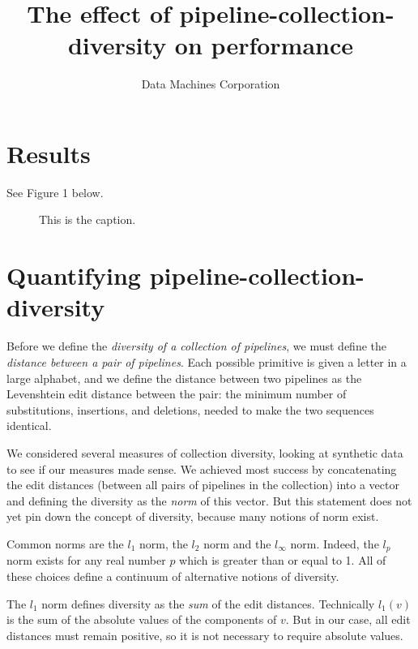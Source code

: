 \documentclass{article}
\title{The effect of pipeline-collection-diversity on performance}
\author{Data Machines Corporation}
\begin{document}
\maketitle


\section{Results}
See Figure 1 below.
\begin{figure}
\caption{This is the caption.}
\end{figure}

\section{Quantifying pipeline-collection-diversity}
  Before we define the \emph{diversity of a collection of pipelines},
  we must define the \emph{distance between a pair of pipelines}.
  Each possible primitive is given a letter in a large alphabet, and
  we define the distance between two pipelines as the Levenshtein edit
  distance between the pair: the minimum number of substitutions,
  insertions, and deletions, needed to make the two sequences
  identical.

  We considered several measures of collection diversity, looking at
  synthetic data to see if our measures made sense.  We achieved most
  success by concatenating the edit distances (between all pairs of
  pipelines in the collection) into a vector and defining the
  diversity as the \emph{norm} of this vector.  But this statement
  does not yet pin down the concept of diversity, because many notions
  of norm exist.

  Common norms are the $l_1$ norm, the $l_2$ norm and the $l_\infty$
  norm.  Indeed, the $l_p$ norm exists for any real number $p$ which
  is greater than or equal to 1.  All of these choices define a
  continuum of alternative notions of diversity.

  The $l_1$ norm defines diversity as the \emph{sum} of the edit
  distances.  Technically $l_1(v)$ is the sum of the absolute values
  of the components of $v$.  But in our case, all edit distances must
  remain positive, so it is not necessary to require absolute values.
\end{document}
